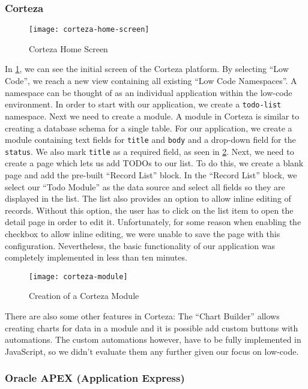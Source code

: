 \documentclass[runningheads]{llncs}
\begin{document}
\subsubsection{Corteza}

\begin{figure}
  \centering
  \texttt{[image: corteza-home-screen]}
  \caption{Corteza Home Screen}
  \label{fig:corteza_home_screen}
\end{figure}

In \cref{fig:corteza_home_screen}, we can see the initial screen of the Corteza platform. By selecting “Low Code”, we reach a new view containing all existing “Low Code Namespaces”. A namespace can be thought of as an individual application within the low-code environment. In order to start with our application, we create a \texttt{todo-list} namespace. Next we need to create a module. A module in Corteza is similar to creating a database schema for a single table. For our application, we create a module containing text fields for \texttt{title} and \texttt{body} and a drop-down field for the \texttt{status}. We also mark \texttt{title} as a required field, as seen in \cref{fig:corteza_module}. Next, we need to create a page which lets us add TODOs to our list. To do this, we create a blank page and add the pre-built “Record List” block. In the “Record List” block, we select our “Todo Module” as the data source and select all fields so they are displayed in the list. The list also provides an option to allow inline editing of records. Without this option, the user has to click on the list item to open the detail page in order to edit it. Unfortunately, for some reason when enabling the checkbox to allow inline editing, we were unable to save the page with this configuration. Nevertheless, the basic functionality of our application was completely implemented in less than ten minutes.

\begin{figure}
  \centering
  \texttt{[image: corteza-module]}
  \caption{Creation of a Corteza Module}
  \label{fig:corteza_module}
\end{figure}

There are also some other features in Corteza: The “Chart Builder” allows creating charts for data in a module and it is possible add custom buttons with automations. The custom automations however, have to be fully implemented in JavaScript, so we didn't evaluate them any further given our focus on low-code.

\subsubsection{Oracle APEX (Application Express)}
\end{document}
